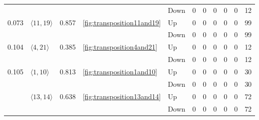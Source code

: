 \documentclass{article}
\begin{document}
\begin{center}
\begin{tabular}{lllllrrrrrr}
 &  &  &  & Down & 0 & 0 & 0 & 0 & 0 & 12 \\
\cline{1-11} \cline{2-11} \cline{3-11} \cline{4-11}
\multirow[t]{2}{*}{0.073} & \multirow[t]{2}{*}{$\langle11, 19\rangle$} & \multirow[t]{2}{*}{0.857} & \multirow[t]{2}{*}{\ref{fig:transposition11and19}} & Up & 0 & 0 & 0 & 0 & 0 & 99 \\
 &  &  &  & Down & 0 & 0 & 0 & 0 & 0 & 99 \\
\cline{1-11} \cline{2-11} \cline{3-11} \cline{4-11}
\multirow[t]{2}{*}{0.104} & \multirow[t]{2}{*}{$\langle4, 21\rangle$} & \multirow[t]{2}{*}{0.385} & \multirow[t]{2}{*}{\ref{fig:transposition4and21}} & Up & 0 & 0 & 0 & 0 & 0 & 12 \\
 &  &  &  & Down & 0 & 0 & 0 & 0 & 0 & 12 \\
\cline{1-11} \cline{2-11} \cline{3-11} \cline{4-11}
\multirow[t]{4}{*}{0.105} & \multirow[t]{2}{*}{$\langle1, 10\rangle$} & \multirow[t]{2}{*}{0.813} & \multirow[t]{2}{*}{\ref{fig:transposition1and10}} & Up & 0 & 0 & 0 & 0 & 0 & 30 \\
 &  &  &  & Down & 0 & 0 & 0 & 0 & 0 & 30 \\
\cline{2-11} \cline{3-11} \cline{4-11}
 & \multirow[t]{2}{*}{$\langle13, 14\rangle$} & \multirow[t]{2}{*}{0.638} & \multirow[t]{2}{*}{\ref{fig:transposition13and14}} & Up & 0 & 0 & 0 & 0 & 0 & 72 \\
 &  &  &  & Down & 0 & 0 & 0 & 0 & 0 & 72 \\
\cline{1-11} \cline{2-11} \cline{3-11} \cline{4-11}
\bottomrule
\end{tabular}


\end{center}
\end{document}
